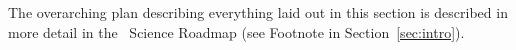 
The overarching plan describing everything laid out in this section is described in more detail in the \lsstdesc\ Science Roadmap (see Footnote in Section~\ref{sec:intro}).
